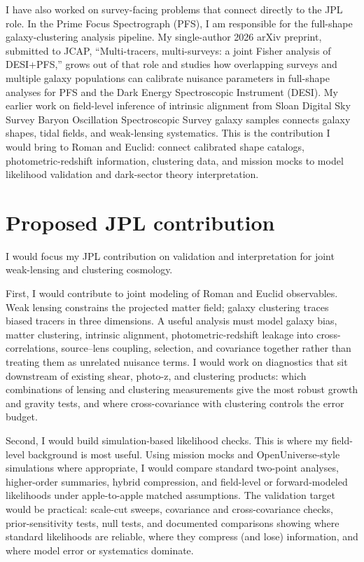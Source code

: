 \documentclass[11pt,letterpaper,sans]{moderncv}
\begin{document}
I have also worked on survey-facing problems that connect directly to the JPL role. In the Prime Focus Spectrograph (PFS), I am responsible for the full-shape galaxy-clustering analysis pipeline. My single-author 2026 arXiv preprint, submitted to JCAP, ``Multi-tracers, multi-surveys: a joint Fisher analysis of DESI+PFS,'' grows out of that role and studies how overlapping surveys and multiple galaxy populations can calibrate nuisance parameters in full-shape analyses for PFS and the Dark Energy Spectroscopic Instrument (DESI). My earlier work on field-level inference of intrinsic alignment from Sloan Digital Sky Survey Baryon Oscillation Spectroscopic Survey galaxy samples connects galaxy shapes, tidal fields, and weak-lensing systematics. This is the contribution I would bring to Roman and Euclid: connect calibrated shape catalogs, photometric-redshift information, clustering data, and mission mocks to model likelihood validation and dark-sector theory interpretation.

\section{Proposed JPL contribution}
I would focus my JPL contribution on validation and interpretation for joint weak-lensing and clustering cosmology.

First, I would contribute to joint modeling of Roman and Euclid observables. Weak lensing constrains the projected matter field; galaxy clustering traces biased tracers in three dimensions. A useful analysis must model galaxy bias, matter clustering, intrinsic alignment, photometric-redshift leakage into cross-correlations, source--lens coupling, selection, and covariance together rather than treating them as unrelated nuisance terms. I would work on diagnostics that sit downstream of existing shear, photo-z, and clustering products: which combinations of lensing and clustering measurements give the most robust growth and gravity tests, and where cross-covariance with clustering controls the error budget.

Second, I would build simulation-based likelihood checks. This is where my field-level background is most useful. Using mission mocks and OpenUniverse-style simulations where appropriate, I would compare standard two-point analyses, higher-order summaries, hybrid compression, and field-level or forward-modeled likelihoods under apple-to-apple matched assumptions. The validation target would be practical: scale-cut sweeps, covariance and cross-covariance checks, prior-sensitivity tests, null tests, and documented comparisons showing where standard likelihoods are reliable, where they compress (and lose) information, and where model error or systematics dominate.
\end{document}
